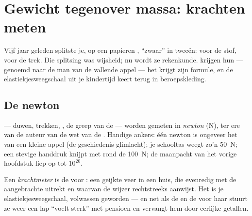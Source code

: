 \chapter{Gewicht tegenover massa: krachten meten}\label{ch:g9:weight-vs-mass}

Vijf jaar geleden splitste je, op een papieren , ``zwaar'' in
tweeën:  voor de stof,  voor de trek.
Die splitsing was wijsheid; nu wordt ze rekenkunde.
 krijgen hun  --- genoemd naar de man van
de vallende appel --- het  krijgt zijn formule, en de
elastiekjesweegschaal uit je kindertijd keert terug in beroepskleding.

\section{De newton}

\begin{definition}[De newton]\label{def:g9:weight-vs-mass:newton}
 --- duwen, trekken, , de greep
van de  --- worden gemeten in
\emph{newton} (\unit{N}), ter ere van de auteur van de
wet van de . Handige ankers: één newton is
ongeveer het  van een kleine appel (de geschiedenis
glimlacht); je schooltas weegt zo'n \qty{50}{N}; een stevige handdruk
knijpt met rond de \qty{100}{N}; de maanpacht van het vorige hoofdstuk
liep op tot $10^{20}$.
\end{definition}

\begin{definition}[Krachtmeter]\label{def:g9:weight-vs-mass:dynamometer}
Een \emph{krachtmeter} is de  voor :
een geijkte veer in een huis, die evenredig met de aangebrachte
 uitrekt en waarvan de wijzer rechtstreeks
 aanwijst. Het is je elastiekjesweegschaal, volwassen
geworden --- en net als de  en de
 voor haar stuurt ze weer een lap ``voelt sterk''
met pensioen en vervangt hem door eerlijke getallen.
\end{definition}

